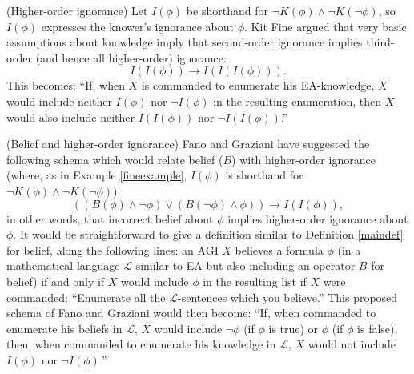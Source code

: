\documentclass[runningheads]{llncs}
\begin{document}
\begin{example}
\label{fineexample}
  (Higher-order ignorance) Let $I(\phi)$ be shorthand for
  $\neg K(\phi)\wedge \neg K(\neg\phi)$, so $I(\phi)$ expresses the knower's
  ignorance about $\phi$. Kit Fine argued \cite{fine2018ignorance} that very
  basic assumptions
  about knowledge imply that second-order ignorance implies third-order (and hence
  all higher-order) ignorance:
  \[
    I(I(\phi)) \rightarrow I(I(I(\phi))).
  \]
  This becomes: ``If, when $X$ is commanded to enumerate his EA-knowledge,
  $X$ would include neither $I(\phi)$ nor $\neg I(\phi)$ in
  the resulting enumeration, then $X$ would also include neither $I(I(\phi))$
  nor $\neg I(I(\phi))$.''
\end{example}

\begin{example}
  (Belief and higher-order ignorance) Fano and Graziani have suggested \cite{fano} the
  following schema which would relate belief ($B$) with higher-order ignorance
  (where, as in Example \ref{fineexample}, $I(\phi)$ is shorthand for
  $\neg K(\phi)\wedge \neg K(\neg\phi)$):
  \[
    ((B(\phi) \wedge \neg\phi)\vee (B(\neg\phi)\wedge \phi)) \rightarrow I(I(\phi)),
  \]
  in other words, that incorrect belief about $\phi$ implies higher-order ignorance
  about $\phi$. It would be straightforward to give a definition similar to
  Definition \ref{maindef} for belief, along the following lines: an AGI $X$
  believes a formula $\phi$ (in a mathematical language $\mathscr L$ similar to EA but also
  including an operator $B$ for belief)
  if and only if $X$ would include $\phi$ in the resulting list if $X$ were
  commanded:
  ``Enumerate all the $\mathscr L$-sentences which you believe.''
  This proposed schema of Fano and Graziani would then become:
  ``If, when commanded to enumerate his beliefs in $\mathscr L$,
  $X$ would include $\neg\phi$ (if $\phi$ is true) or $\phi$ (if $\phi$ is false),
  then, when commanded to enumerate his knowledge in $\mathscr L$,
  $X$ would not include $I(\phi)$ nor $\neg I(\phi)$.''
\end{example}
\end{document}

